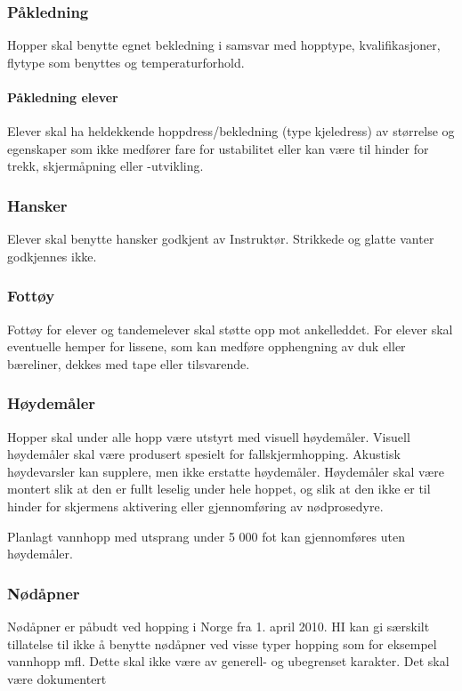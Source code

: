 \subsubsection{Påkledning}
Hopper skal benytte egnet bekledning i samsvar med hopptype, kvalifikasjoner, flytype som benyttes og temperaturforhold.

\paragraph{Påkledning elever}
Elever skal ha heldekkende hoppdress/bekledning (type kjeledress) av størrelse og egenskaper som ikke medfører fare for ustabilitet eller kan være til hinder for trekk, skjermåpning eller -utvikling.

\subsubsection{Hansker}
Elever skal benytte hansker godkjent av Instruktør. Strikkede og glatte vanter godkjennes ikke.

\subsubsection{Fottøy}
Fottøy for elever og tandemelever skal støtte opp mot ankelleddet. For elever skal eventuelle hemper for lissene, som kan medføre opphengning av duk eller bæreliner, dekkes med tape eller tilsvarende.

\subsubsection{Høydemåler}
Hopper skal under alle hopp være utstyrt med visuell høydemåler. Visuell høydemåler skal være produsert spesielt for fallskjermhopping. Akustisk høydevarsler kan supplere, men ikke erstatte høydemåler. Høydemåler skal være montert slik at den er fullt leselig under hele hoppet, og slik at den ikke er til hinder for skjermens aktivering eller gjennomføring av nødprosedyre.

Planlagt vannhopp med utsprang under 5 000 fot kan gjennomføres uten høydemåler.

\subsubsection{Nødåpner}
Nødåpner er påbudt ved hopping i Norge fra 1. april 2010. HI kan gi særskilt tillatelse til ikke å benytte nødåpner ved visse typer hopping som for eksempel vannhopp mfl. Dette skal ikke være av generell- og ubegrenset karakter. Det skal være dokumentert

